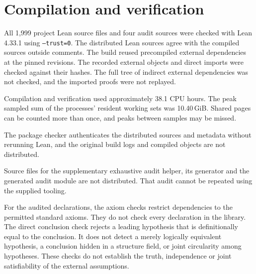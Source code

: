 \section{Compilation and verification}
\label{sec:compilation-resources}

All 1,999 project Lean source files and four audit sources were checked
with Lean 4.33.1 using \texttt{--trust=0}. The distributed Lean sources
agree with the compiled sources outside comments. The build reused
precompiled external dependencies at the pinned revisions. The recorded
external objects and direct imports were checked against their hashes.
The full tree of indirect external dependencies was not checked, and the
imported proofs were not replayed.

Compilation and verification used approximately 38.1 CPU hours. The peak
sampled sum of the processes' resident working sets was 10.40\,GiB.
Shared pages can be counted more than once, and peaks between samples
may be missed.

The package checker authenticates the distributed sources and metadata
without rerunning Lean, and the original build logs and compiled objects
are not distributed.

Source files for the supplementary exhaustive audit helper, its generator
and the generated audit module are not distributed. That audit cannot
be repeated using the supplied tooling.

For the audited declarations, the axiom checks restrict dependencies to
the permitted standard axioms. They do not check every declaration in the
library. The direct conclusion check rejects a leading hypothesis that
is definitionally equal to the conclusion.
It does not detect a merely logically equivalent hypothesis, a conclusion
hidden in a structure field, or joint circularity among hypotheses.
These checks do not establish the truth, independence or joint
satisfiability of the external assumptions.
